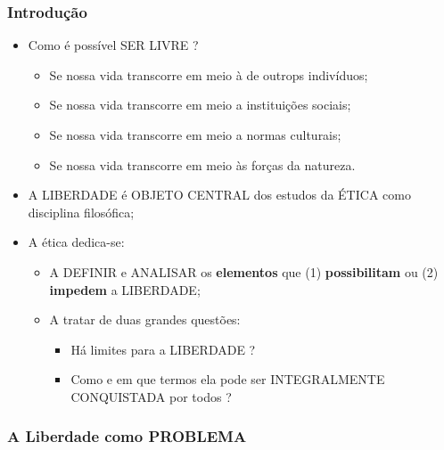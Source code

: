 \documentclass[
]{book}
\providecommand{\tightlist}{%
  \setlength{\itemsep}{0pt}\setlength{\parskip}{0pt}}
\begin{document}
\hypertarget{introduuxe7uxe3o}{%
\subsubsection{Introdução}\label{introduuxe7uxe3o}}

\begin{itemize}
\tightlist
\item
  Como é possível SER LIVRE ?

  \begin{itemize}
  \tightlist
  \item
    Se nossa vida transcorre em meio à de outrops indivíduos;
  \item
    Se nossa vida transcorre em meio a instituições sociais;
  \item
    Se nossa vida transcorre em meio a normas culturais;
  \item
    Se nossa vida transcorre em meio às forças da natureza.
  \end{itemize}
\item
  A LIBERDADE é OBJETO CENTRAL dos estudos da ÉTICA como disciplina
  filosófica;
\item
  A ética dedica-se:

  \begin{itemize}
  \tightlist
  \item
    A DEFINIR e ANALISAR os \textbf{elementos} que (1)
    \textbf{possibilitam} ou (2) \textbf{impedem} a LIBERDADE;
  \item
    A tratar de duas grandes questões:

    \begin{itemize}
    \tightlist
    \item
      Há limites para a LIBERDADE ?
    \item
      Como e em que termos ela pode ser INTEGRALMENTE CONQUISTADA por
      todos ?
    \end{itemize}
  \end{itemize}
\end{itemize}

\hypertarget{a-liberdade-como-problema}{%
\subsubsection{A Liberdade como
PROBLEMA}\label{a-liberdade-como-problema}}
\end{document}
